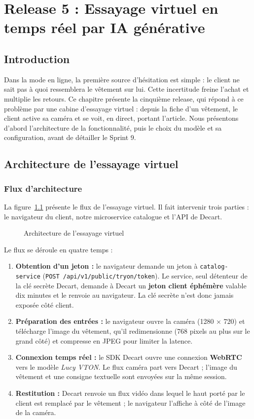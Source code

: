 \thispagestyle{fancy}
\chapter{Release 5 : Essayage virtuel en temps réel par IA générative}
\section*{Introduction}
Dans la mode en ligne, la première source d'hésitation est simple : le client ne sait pas à quoi ressemblera le vêtement sur lui. Cette incertitude freine l'achat et multiplie les retours. Ce chapitre présente la cinquième release, qui répond à ce problème par une cabine d'essayage virtuel : depuis la fiche d'un vêtement, le client active sa caméra et se voit, en direct, portant l'article. Nous présentons d'abord l'architecture de la fonctionnalité, puis le choix du modèle et sa configuration, avant de détailler le Sprint 9.

\section{Architecture de l'essayage virtuel}
\subsection{Flux d'architecture}
La figure~\ref{fig:archi-tryon} présente le flux de l'essayage virtuel. Il fait intervenir trois parties : le navigateur du client, notre microservice catalogue et l'API de Decart.
\begin{figure}[H]
    \centering
    \caption{Architecture de l'essayage virtuel}
    \label{fig:archi-tryon}
\end{figure}

Le flux se déroule en quatre temps :
\begin{enumerate}
  \item \textbf{Obtention d'un jeton :} le navigateur demande un jeton à \texttt{catalog-service} (\texttt{POST /api/v1/public/tryon/token}). Le service, seul détenteur de la clé secrète Decart, demande à Decart un \textbf{jeton client éphémère} valable dix minutes et le renvoie au navigateur. La clé secrète n'est donc jamais exposée côté client.
  \item \textbf{Préparation des entrées :} le navigateur ouvre la caméra (1280 × 720) et télécharge l'image du vêtement, qu'il redimensionne (768 pixels au plus sur le grand côté) et compresse en JPEG pour limiter la latence.
  \item \textbf{Connexion temps réel :} le SDK Decart ouvre une connexion \textbf{WebRTC} vers le modèle \textit{Lucy VTON}. Le flux caméra part vers Decart ; l'image du vêtement et une consigne textuelle sont envoyées sur la même session.
  \item \textbf{Restitution :} Decart renvoie un flux vidéo dans lequel le haut porté par le client est remplacé par le vêtement ; le navigateur l'affiche à côté de l'image de la caméra.
\end{enumerate}

